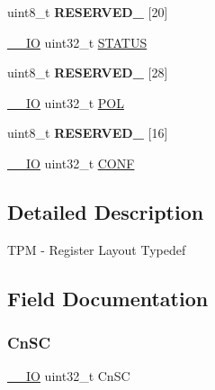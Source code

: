 \begin{DoxyCompactItemize}
\begin{tabbing}
\end{tabbing}\item 
\mbox{\label{struct_t_p_m___type_a5c429acbda13071dcc526ade1805a10a}} 
uint8\+\_\+t {\bfseries R\+E\+S\+E\+R\+V\+E\+D\+\_} \mbox{[}20\mbox{]}
\item 
\mbox{\hyperlink{core__cm0plus_8h_aec43007d9998a0a0e01faede4133d6be}{\+\_\+\+\_\+\+IO}} uint32\+\_\+t \mbox{\hyperlink{struct_t_p_m___type_a0b3f4c41f87ca52c3b6bca0bafa0df6b}{S\+T\+A\+T\+US}}
\item 
\mbox{\label{struct_t_p_m___type_a110c7cdc6ff066e67353a119359731f2}} 
uint8\+\_\+t {\bfseries R\+E\+S\+E\+R\+V\+E\+D\+\_} \mbox{[}28\mbox{]}
\item 
\mbox{\hyperlink{core__cm0plus_8h_aec43007d9998a0a0e01faede4133d6be}{\+\_\+\+\_\+\+IO}} uint32\+\_\+t \mbox{\hyperlink{struct_t_p_m___type_a9037a11797290aef4ac48048c07e2e89}{P\+OL}}
\item 
\mbox{\label{struct_t_p_m___type_a290262cc4edb96ebeefaae3da3cda0d7}} 
uint8\+\_\+t {\bfseries R\+E\+S\+E\+R\+V\+E\+D\+\_} \mbox{[}16\mbox{]}
\item 
\mbox{\hyperlink{core__cm0plus_8h_aec43007d9998a0a0e01faede4133d6be}{\+\_\+\+\_\+\+IO}} uint32\+\_\+t \mbox{\hyperlink{struct_t_p_m___type_a42f5a13cd52a3f76b0b20e3e7cb441b4}{C\+O\+NF}}
\end{DoxyCompactItemize}


\subsection{Detailed Description}
T\+PM -\/ Register Layout Typedef 

\subsection{Field Documentation}
\mbox{\label{struct_t_p_m___type_a3c6b2dbabce20880a5d35da93176e863}} 
\subsubsection{\texorpdfstring{CnSC}{CnSC}}
{\footnotesize\ttfamily \mbox{\hyperlink{core__cm0plus_8h_aec43007d9998a0a0e01faede4133d6be}{\+\_\+\+\_\+\+IO}} uint32\+\_\+t Cn\+SC}

